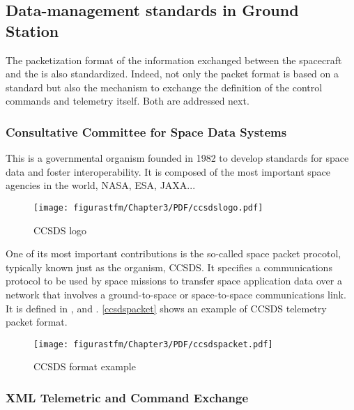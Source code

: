 \subsection{Data-management standards in Ground Station}

The packetization format of the information exchanged between the spacecraft and the  is also standardized. Indeed, not only the packet format is based on a standard but also the mechanism to exchange the definition of the control commands and telemetry itself. Both are addressed next.

\subsubsection{Consultative Committee for Space Data Systems} \label{ccsds}

This is a governmental organism founded in 1982 to develop standards for space data and foster interoperability. It is composed of the most important space agencies in the world, \acrshort{NASA}, \acrshort{ESA}, \acrshort{JAXA}...

\begin{figure}[H]
			\centering
			\texttt{[image: figurastfm/Chapter3/PDF/ccsdslogo.pdf]}
			\caption{\acrshort{CCSDS} logo} 
		\end{figure}


One of its most important contributions is the so-called space packet procotol, typically known just as the organism, \acrshort{CCSDS}. It specifies a communications protocol to be used by space missions to transfer space application data over a network that involves a ground-to-space or space-to-space communications link. It is defined in \cite{ccsds1}, \cite{ccsds2} and \cite{ccsds3}. \autoref{ccsdspacket} shows an example of \acrshort{CCSDS} telemetry packet format.

\begin{figure}[H]
			\centering
			\texttt{[image: figurastfm/Chapter3/PDF/ccsdspacket.pdf]}
			\caption{\acrshort{CCSDS} format example \cite{ccsds2}} \label{ccsdspacket}
			\vspace{-1cm}
		\end{figure}


\subsubsection{XML Telemetric and Command Exchange} \label{xtce}

